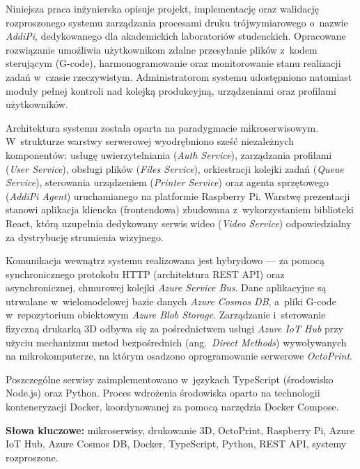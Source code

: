 \documentclass[a4paper,12pt,reqno]{article}
\begin{document}
Niniejsza praca inżynierska opisuje projekt, implementację oraz walidację rozproszonego systemu zarządzania procesami druku trójwymiarowego o~nazwie \textit{AddiPi}, dedykowanego dla akademickich laboratoriów studenckich. Opracowane rozwiązanie umożliwia użytkownikom zdalne przesyłanie plików z~kodem sterującym (G-code), harmonogramowanie oraz monitorowanie stanu realizacji zadań w~czasie rzeczywistym. Administratorom systemu udostępniono natomiast moduły pełnej kontroli nad kolejką produkcyjną, urządzeniami oraz profilami użytkowników.

Architektura systemu została oparta na paradygmacie mikroserwisowym. W~strukturze warstwy serwerowej wyodrębniono sześć niezależnych komponentów: usługę uwierzytelniania (\textit{Auth Service}), zarządzania profilami (\textit{User Service}), obsługi plików (\textit{Files Service}), orkiestracji kolejki zadań (\textit{Queue Service}), sterowania urządzeniem (\textit{Printer Service}) oraz agenta sprzętowego (\textit{AddiPi Agent}) uruchamianego na platformie Raspberry Pi. Warstwę prezentacji stanowi aplikacja kliencka (frontendowa) zbudowana z~wykorzystaniem biblioteki React, którą uzupełnia dedykowany serwis wideo (\textit{Video Service}) odpowiedzialny za dystrybucję strumienia wizyjnego.

Komunikacja wewnątrz systemu realizowana jest hybrydowo --- za pomocą synchronicznego protokołu HTTP (architektura REST API) oraz asynchronicznej, chmurowej kolejki \textit{Azure Service Bus}. Dane aplikacyjne są utrwalane w~wielomodelowej bazie danych \textit{Azure Cosmos DB}, a~pliki G-code w~repozytorium obiektowym \textit{Azure Blob Storage}. Zarządzanie i~sterowanie fizyczną drukarką 3D odbywa się za pośrednictwem usługi \textit{Azure IoT Hub} przy użyciu mechanizmu metod bezpośrednich (ang.~\textit{Direct Methods}) wywoływanych na mikrokomputerze, na którym osadzono oprogramowanie serwerowe \textit{OctoPrint}.

Poszczególne serwisy zaimplementowano w~językach TypeScript (środowisko Node.js) oraz Python. Proces wdrożenia środowiska oparto na technologii konteneryzacji Docker, koordynowanej za pomocą narzędzia Docker Compose. 

\vspace{0.5cm}
\noindent\textbf{Słowa kluczowe:} mikroserwisy, drukowanie 3D, OctoPrint, Raspberry Pi, Azure IoT Hub, Azure Cosmos DB, Docker, TypeScript, Python, REST API, systemy rozproszone.


\newpage

\end{document}
